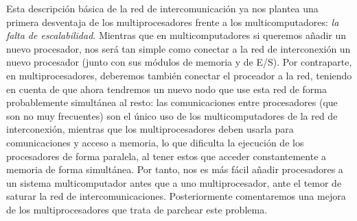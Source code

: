 Esta descripción básica de la red de intercomunicación ya nos plantea una primera desventaja de los multiprocesadores frente a los multicomputadores: \emph{la falta de escalabilidad}. Mientras que en multicomputadores si queremos añadir un nuevo procesador, nos será tan simple como conectar a la red de interconexión un nuevo procesador (junto con sus módulos de memoria y de E/S). Por contraparte, en multiprocesadores, deberemos también conectar el proceador a la red, teniendo en cuenta de que ahora tendremos un nuevo nodo que use esta red de forma probablemente simultánea al resto: las comunicaciones entre procesadores (que son no muy frecuentes) son el único uso de los multicomputadores de la red de interconexión, mientras que los multiprocesadores deben usarla para comunicaciones y acceso a memoria, lo que dificulta la ejecución de los procesadores de forma paralela, al tener estos que acceder constantemente a memoria de forma simultánea. Por tanto, nos es más fácil añadir procesadores a un sistema multicomputador antes que a uno multiprocesador, ante el temor de saturar la red de intercomunicaciones. Posteriormente comentaremos una mejora de los multiprocesadores que trata de parchear este problema.

